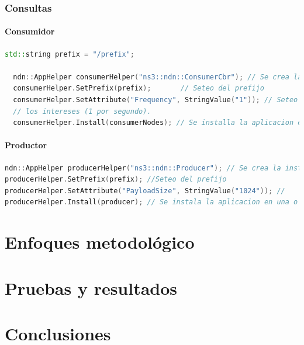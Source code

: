 \documentclass[12pt]{ociamthesis}  %
\begin{document}
\subsection{Consultas}
\subsubsection{Consumidor}

\begin{lstlisting}[language=cpp,caption={Caption}]
  std::string prefix = "/prefix";
  
  ndn::AppHelper consumerHelper("ns3::ndn::ConsumerCbr"); // Se crea la instancia
  consumerHelper.SetPrefix(prefix);       // Seteo del prefijo
  consumerHelper.SetAttribute("Frequency", StringValue("1")); // Seteo de la frecuencia en que enviara 
  // los intereses (1 por segundo).
  consumerHelper.Install(consumerNodes); // Se installa la aplicacion en uno o mas nodos.
\end{lstlisting}


\subsubsection{Productor}
\begin{lstlisting}[language=cpp,caption={Caption}]
ndn::AppHelper producerHelper("ns3::ndn::Producer"); // Se crea la instancia
producerHelper.SetPrefix(prefix); //Seteo del prefijo
producerHelper.SetAttribute("PayloadSize", StringValue("1024")); //
producerHelper.Install(producer); // Se instala la aplicacion en una o mas nodos.
\end{lstlisting}

\chapter{Enfoques metodológico}

\chapter{Pruebas y resultados}

\chapter{Conclusiones}

\end{document}
